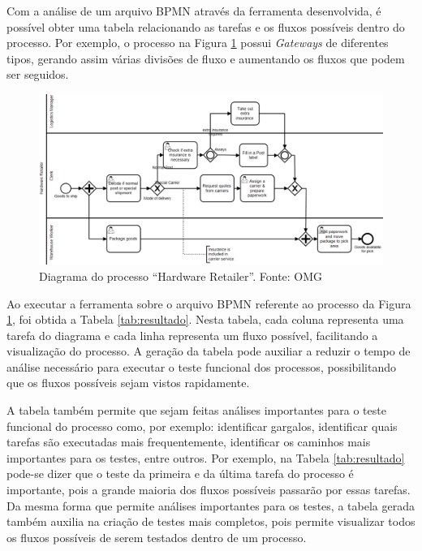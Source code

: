 \documentclass[12pt]{article}
\begin{document}
Com a análise de um arquivo BPMN através da ferramenta desenvolvida, é possível obter uma tabela relacionando as tarefas e os fluxos possíveis dentro do processo. Por exemplo, o processo na Figura \ref{fig:diagrama_exemplo} possui \emph{Gateways} de diferentes tipos, gerando assim várias divisões de fluxo e aumentando os fluxos que podem ser seguidos. 

\begin{figure}[ht]
\includegraphics[width=1.0\textwidth]{figuras/diagrama_exemplo.png}
\caption{Diagrama do processo ``Hardware Retailer''. Fonte: OMG}
\label{fig:diagrama_exemplo}
\end{figure}

Ao executar a ferramenta sobre o arquivo BPMN referente ao processo da Figura \ref{fig:diagrama_exemplo}, foi obtida a Tabela \ref{tab:resultado}. Nesta tabela, cada coluna representa uma tarefa do diagrama e cada linha representa um fluxo possível, facilitando a visualização do processo. A geração da tabela pode auxiliar a reduzir o tempo de análise necessário para executar o teste funcional dos processos, possibilitando que os fluxos possíveis sejam vistos rapidamente. 

A tabela também permite que sejam feitas análises importantes para o teste funcional do processo como, por exemplo: identificar gargalos, identificar quais tarefas são executadas mais frequentemente, identificar os caminhos mais importantes para os testes, entre outros. Por exemplo, na Tabela \ref{tab:resultado} pode-se dizer que o teste da primeira e da última tarefa do processo é importante, pois a grande maioria dos fluxos possíveis passarão por essas tarefas. Da mesma forma que permite análises importantes para os testes, a tabela gerada também auxilia na criação de testes mais completos, pois permite visualizar todos os fluxos possíveis de serem testados dentro de um processo.
\end{document}
